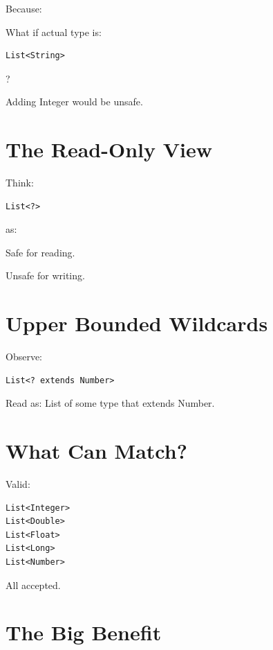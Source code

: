 \documentclass[11pt,a4paper]{book}
\begin{document}
Because:

What if actual type is:

\begin{verbatim} 
List<String>
\end{verbatim}

?


Adding Integer would be unsafe.

\section{The Read-Only View}

Think:

\begin{verbatim} 
List<?>
\end{verbatim}

as:

\textcolor{RosettaDeepGreen}{Safe} for reading.

\textcolor{RosettaRed}{Unsafe} for writing.

\section{Upper Bounded Wildcards}

Observe:

\begin{verbatim} 
List<? extends Number>
\end{verbatim}

Read as: 
List of some type
that extends Number.

\section{What Can Match?}

Valid:

\begin{verbatim} 
List<Integer>
List<Double>
List<Float>
List<Long>
List<Number>
\end{verbatim}

All accepted.

\section{The Big Benefit}
\end{document}
